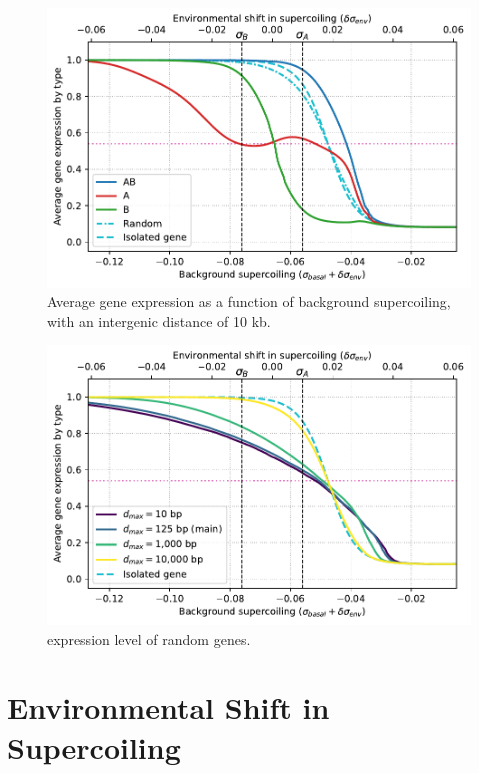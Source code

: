 \begin{figure}

\includegraphics[width=\textwidth]{param/mean-intergene/inter-10k/activity_sigmas_avg.pdf}
\caption{Average gene expression as a function of background supercoiling, with an intergenic distance of 10 kb.}
\end{figure}


\begin{figure}

\includegraphics[width=\textwidth]{param/mean-intergene/random_activ_per_sigma.pdf}
\caption{expression level of random genes.}
\end{figure}








\FloatBlock

\section{Environmental Shift in Supercoiling}


